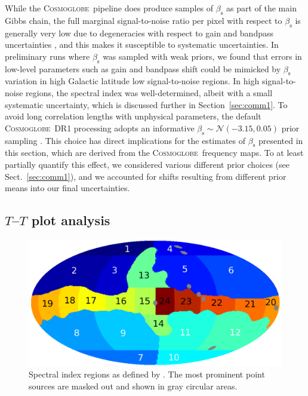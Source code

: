 \documentclass[twocolumn]{../../common/aa}
\def\commanderthree{\texttt{Commander3}}
\newcommand{\cosmoglobe}{\textsc{Cosmoglobe}}
\begin{document}
While the \cosmoglobe\ pipeline does produce samples of $\beta_{\mathrm{s}}$ as part of the main Gibbs chain, the full marginal signal-to-noise ratio per pixel with respect to $\beta_{\mathrm{s}}$ is generally very low due to degeneracies with respect to gain and bandpass uncertainties \citep{bp07,bp09}, and this makes it susceptible to systematic uncertainties. 
In preliminary runs where $\beta_\mathrm s$ was sampled with weak priors, we found that errors in low-level parameters such as gain and bandpass shift could be mimicked by $\beta_\mathrm s$ variation in high Galactic latitude low signal-to-noise regions. 
In high signal-to-noise regions, the spectral index was well-determined, albeit with a small systematic uncertainty, which is discussed further in Section~\ref{sec:comm1}.
To avoid long correlation lengths with unphysical parameters, the default \cosmoglobe\ DR1 processing adopts an informative $\beta_\mathrm s\sim\mathcal N(-3.15, 0.05)$ prior sampling \citep{watts2023_dr1}. This choice has direct implications for the estimates of $\beta_{\mathrm{s}}$ presented in this section, which are derived from the \cosmoglobe\ frequency maps. To at least partially quantify this effect, we considered various different prior choices (see Sect.~\ref{sec:comm1}), and we accounted for shifts resulting from different prior means into our final uncertainties.




\subsection{$T$--$T$ plot analysis}
\label{sec:tt_plot}

\begin{figure}
        \centering
        \includegraphics[width=\linewidth]{figures/utnymaske_tall_converted.pdf}
	\caption{Spectral index regions as defined by \citet{fuskeland2014}. The most prominent point sources are masked out and shown in gray circular areas.         }
        \label{fig:regions}
\end{figure}
\end{document}
